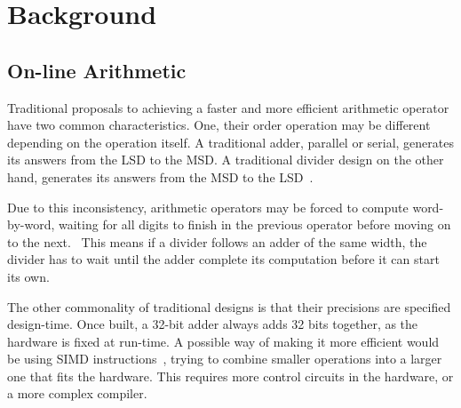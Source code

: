 \documentclass[journal]{IEEEtran}
\begin{document}
\section{Background}

\subsection{On-line Arithmetic}
Traditional proposals to achieving a faster and more efficient arithmetic
operator have two common characteristics.
One, their order operation may be different depending on the operation itself.
A traditional adder, parallel or serial, generates its answers from the LSD to
the MSD.
A traditional divider design on the other hand, generates its answers from
the MSD to the LSD~\cite{Brent1}\cite{Srinivas1}.

Due to this inconsistency, arithmetic operators may be forced to compute
word-by-word, waiting for all digits to finish in the previous operator before
moving on to the next.~\cite{Zhao1}
This means if a divider follows an adder of the same width, the divider has to
wait until the adder complete its computation before it can start its own.

The other commonality of traditional designs is that their precisions are
specified design-time. Once built, a 32-bit adder always adds 32 bits together,
as the hardware is fixed at run-time.
A possible way of making it more efficient would be using SIMD
instructions~\cite{Duncan1}, trying to combine smaller operations into a larger
one that fits the hardware.
This requires more control circuits in the hardware, or a more complex compiler.
\end{document}

